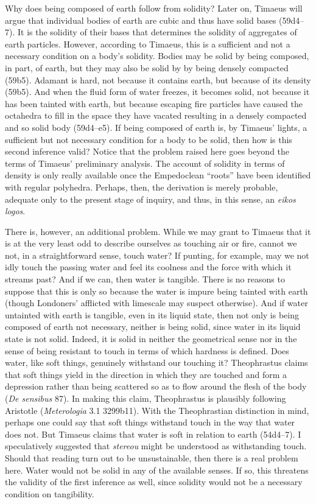 Why does being composed of earth follow from solidity? Later on, Timaeus will argue that individual bodies of earth are cubic and thus have solid bases (59d4--7). It is the solidity of their bases that determines the solidity of aggregates of earth particles. However, according to Timaeus, this is a sufficient and not a necessary condition on a body's solidity. Bodies may be solid by being composed, in part, of earth, but they may also be solid by by being densely compacted (59b5). Adamant is hard, not because it contains earth, but because of its density (59b5). And when the fluid form of water freezes, it becomes solid, not because it has been tainted with earth, but because escaping fire particles have caused the octahedra to fill in the space they have vacated resulting in a densely compacted and so solid body (59d4–e5). If being composed of earth is, by Timaeus' lights, a sufficient but not necessary condition for a body to be solid, then how is this second inference valid? Notice that the problem raised here goes beyond the terms of Timaeus' preliminary analysis. The account of solidity in terms of density is only really available once the Empedoclean ``roots'' have been identified with regular polyhedra. Perhaps, then, the derivation is merely probable, adequate only to the present stage of inquiry, and thus, in this sense, an \emph{eikos logos}.

There is, however, an additional problem. While we may grant to Timaeus that it is at the very least odd to describe ourselves as touching air or fire, cannot we not, in a straightforward sense, touch water? If punting, for example, may we not idly touch the passing water and feel its coolness and the force with which it streams past? And if we can, then water is tangible. There is no reasons to suppose that this is only so because the water is impure being tainted with earth (though Londoners' afflicted with limescale may suspect otherwise). And if water untainted with earth is tangible, even in its liquid state, then not only is being composed of earth not necessary, neither is being solid, since water in its liquid state is not solid. Indeed, it is solid in neither the geometrical sense nor in the sense of being resistant to touch in terms of which hardness is defined. Does water, like soft things, genuinely withstand our touching it? Theophrastus claims that soft things yield in the direction in which they are touched and form a depression rather than being scattered so as to flow around the flesh of the body (\emph{De sensibus} 87). In making this claim, Theophrastus is plausibly following Aristotle (\emph{Meterologia} 3.1 3299b11). With the Theophrastian distinction in mind, perhaps one could say that soft things withstand touch in the way that water does not. But Timaeus claims that water is soft in relation to earth (54d4–7). I speculatively suggested that \emph{stereou} might be understood as withstanding touch. Should that reading turn out to be unsustainable, then there is a real problem here. Water would not be solid in any of the available senses. If so, this threatens the validity of the first inference as well, since solidity would not be a necessary condition on tangibility. 

